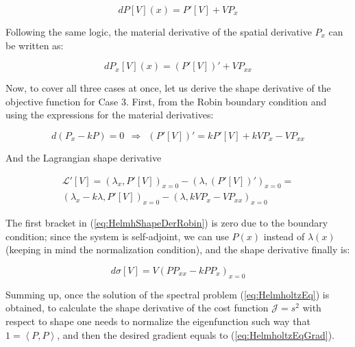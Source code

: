 \begin{equation}
dP[V](x) = P'[V] + V P_x 
\end{equation}

Following the same logic, the material derivative of the spatial derivative $P_x$ can be written as:

\begin{equation}
dP_x[V](x) = \left(P'[V]\right)' + V P_{xx} 
\end{equation}

Now, to cover all three cases at once, let us derive the shape derivative of the objective function for Case 3. First, from the Robin boundary condition and using the expressions for the material derivatives:

\begin{equation}
d(P_x - k P) = 0 \ \ \Rightarrow \ \ \left(P'[V]\right)' = k P'[V] + k V P_x -  V P_{xx}
\end{equation}

And the Lagrangian shape derivative

\begin{subequations}
\begin{align}
\mathcal{L}'[V] = \left( \lambda_x , P'[V] \right)_{x = 0} - \left( \lambda , \left(P'[V]\right)'  \right)_{x = 0} = \\
\label{eq:HelmhShapeDerRobin}
\left( \lambda_x - k \lambda, P'[V] \right)_{x = 0}- \left( \lambda , k V P_x - VP_{xx}  \right)_{x = 0}
\end{align}
\end{subequations}

The first bracket in (\ref{eq:HelmhShapeDerRobin}) is zero due to the boundary condition; since the system is self-adjoint, we can use $P(x)$ instead of $\lambda(x)$ (keeping in mind the normalization condition), and the shape derivative finally is:

\begin{equation}
\label{eq:HelmholtzEqGrad}
    d \sigma [V] = V \left( P P_{xx} - k P P_x \right)_{x = 0}
\end{equation}

Summing up, once the solution of the spectral problem (\ref{eq:HelmholtzEq}) is obtained, to calculate the shape derivative of the cost function $\mathcal{J} = s^2$ with respect to shape one needs to normalize the eigenfunction such way that $1 = \left<P,P\right>$, and then the desired gradient equals to (\ref{eq:HelmholtzEqGrad}).

\clearpage

